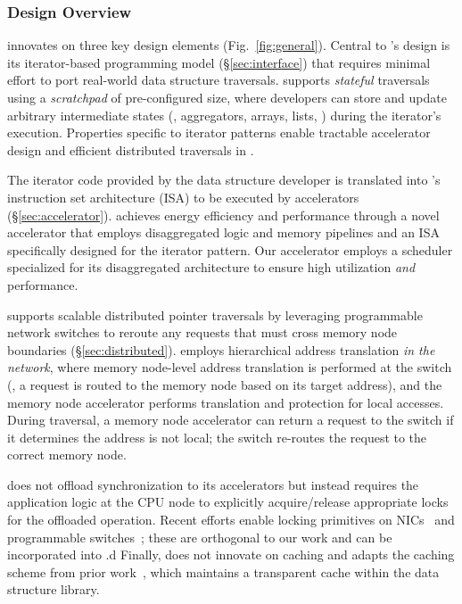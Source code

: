 \subsubsection{\name Design Overview}
\label{ssec:overview}


\name innovates on three key design elements (Fig.~\ref{fig:general}). Central to \name's design is its iterator-based programming model (\S\ref{sec:interface}) that requires minimal effort to port real-world data structure traversals. \name supports \emph{stateful} traversals using a \emph{scratchpad} of pre-configured size, where developers can store and update arbitrary intermediate states (\eg, aggregators, arrays, lists, \etc) during the iterator's execution. Properties specific to iterator patterns enable tractable accelerator design and efficient distributed traversals in \name. 

The iterator code provided by the data structure developer is translated into \name's instruction set architecture (ISA) to be executed by \name accelerators (\S\ref{sec:accelerator}). \name achieves energy efficiency and performance through a novel accelerator that employs disaggregated logic and memory pipelines and an ISA specifically designed for the iterator pattern. Our accelerator employs a scheduler specialized for its disaggregated architecture to ensure high utilization \emph{and} performance. 


\name supports scalable distributed pointer traversals by leveraging programmable network switches to reroute any requests that must cross memory node boundaries (\S\ref{sec:distributed}). \name employs hierarchical address translation \emph{in the network}, where memory node-level address translation is performed at the switch (\ie, a request is routed to the memory node based on its target address), and the memory node accelerator performs translation and protection for local accesses. During traversal, a memory node accelerator can return a request to the switch if it determines the address is not local; the switch re-routes the request to the correct memory node.


 \name does not offload synchronization to its accelerators but instead requires the application logic at the CPU node to explicitly acquire/release appropriate locks for the offloaded operation. Recent efforts enable locking primitives on NICs~\cite{sherman, clover} and programmable switches~\cite{netlock}; these are orthogonal to our work and can be incorporated into \name.d
Finally, \name does not innovate on caching and adapts the caching scheme from prior work~\cite{aifm}, which maintains a transparent cache within the data structure library. 
